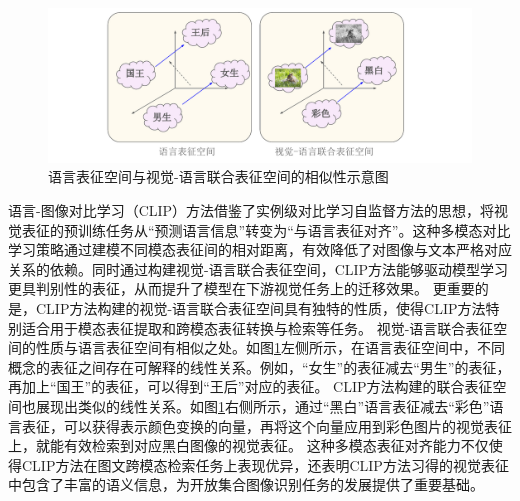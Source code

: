 

\begin{figure}
  \centering
  \includegraphics[width=1.0\linewidth]{figures/论文-CLIP性质-v2.pdf}
  \caption{语言表征空间与视觉-语言联合表征空间的相似性示意图}
  \label{fig:clip-word2vec}
\end{figure}

语言-图像对比学习（CLIP）方法\cite{radford2021learning,jia2021scaling,pham2023combined}借鉴了实例级对比学习自监督方法的思想，将视觉表征的预训练任务从“预测语言信息”转变为“与语言表征对齐”。这种多模态对比学习策略通过建模不同模态表征间的相对距离，有效降低了对图像与文本严格对应关系的依赖。同时通过构建视觉-语言联合表征空间，CLIP方法能够驱动模型学习更具判别性的表征，从而提升了模型在下游视觉任务上的迁移效果。
更重要的是，CLIP方法构建的视觉-语言联合表征空间具有独特的性质，使得CLIP方法特别适合用于模态表征提取和跨模态表征转换与检索等任务。
视觉-语言联合表征空间的性质与语言表征空间\cite{word2vec,distword2vec}有相似之处。如图\ref{fig:clip-word2vec}左侧所示，在语言表征空间中，不同概念的表征之间存在可解释的线性关系。例如，“女生”的表征减去“男生”的表征，再加上“国王”的表征，可以得到“王后”对应的表征。
CLIP方法构建的联合表征空间也展现出类似的线性关系。如图\ref{fig:clip-word2vec}右侧所示，通过“黑白”语言表征减去“彩色”语言表征，可以获得表示颜色变换的向量，再将这个向量应用到彩色图片的视觉表征上，就能有效检索到对应黑白图像的视觉表征。
这种多模态表征对齐能力不仅使得CLIP方法在图文跨模态检索任务上表现优异，还表明CLIP方法习得的视觉表征中包含了丰富的语义信息，为开放集合图像识别任务的发展提供了重要基础。

